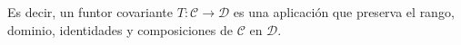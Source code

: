 Es decir, un funtor covariante $T: \mathcal{C} \rightarrow \mathcal{D}$ es una aplicación que preserva el rango, dominio, identidades y composiciones de $\mathcal{C}$ en $\mathcal{D}$.

\endinput
